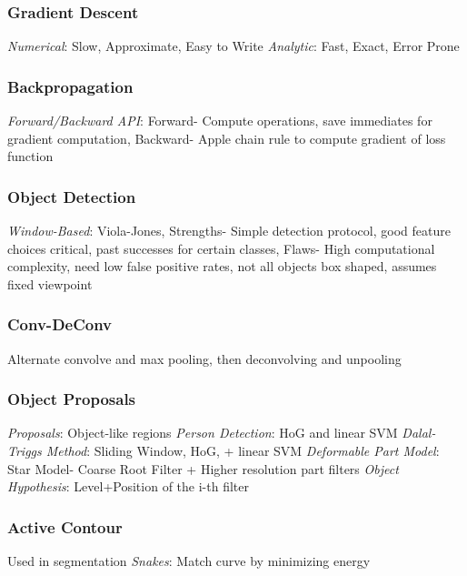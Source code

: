 \documentclass{article}
\begin{document}
\begin{multicols*}{2}
        \subsubsection*{Gradient Descent}
        \textit{Numerical}: Slow, Approximate, Easy to Write\newline
        \textit{Analytic}: Fast, Exact, Error Prone
        \subsubsection*{Backpropagation}
        \textit{Forward/Backward API}: Forward- Compute operations, save immediates for gradient
        computation, Backward- Apple chain rule to compute gradient of loss function
        \subsubsection*{Object Detection}
        \textit{Window-Based}: Viola-Jones, Strengths- Simple detection protocol, good feature
        choices critical, past successes for certain classes, Flaws- High computational
        complexity, need low false positive rates, not all objects box shaped, assumes fixed
        viewpoint
        \subsubsection*{Conv-DeConv}
        Alternate convolve and max pooling, then deconvolving and unpooling
        \subsubsection*{Object Proposals}
        \textit{Proposals}: Object-like regions\newline
        \textit{Person Detection}: HoG and linear SVM\newline
        \textit{Dalal-Triggs Method}: Sliding Window, HoG, + linear SVM\newline
        \textit{Deformable Part Model}: Star Model- Coarse Root Filter + Higher resolution part
        filters\newline
        \textit{Object Hypothesis}: Level+Position of the i-th filter
        \subsubsection*{Active Contour}
        Used in segmentation\newline
        \textit{Snakes}: Match curve by minimizing energy

\end{multicols*}
\end{document}
